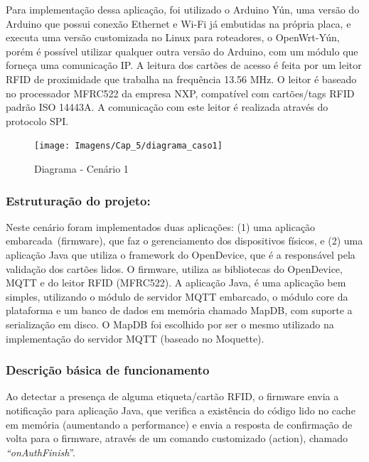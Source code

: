 Para implementação dessa aplicação, foi utilizado o Arduino Yún, uma
versão do Arduino que possui conexão Ethernet e Wi-Fi já embutidas
na própria placa, e executa uma versão customizada no Linux para roteadores,
o OpenWrt-Yún\cite{openwrt-yun}, porém é possível utilizar qualquer
outra versão do Arduino, com um módulo que forneça uma comunicação
IP. A leitura dos cartões de acesso é feita por um leitor RFID de
proximidade que trabalha na frequência 13.56 MHz. O leitor é baseado
no processador MFRC522\cite{MFRC522} da empresa NXP, compatível com
cartões/tags RFID padrão ISO 14443A. A comunicação com este leitor
é realizada através do protocolo SPI\cite{spi1,spi2}.

\begin{figure}[H]
\begin{centering}
\texttt{[image: Imagens/Cap\_5/diagrama\_caso1]}
\par\end{centering}
\caption{Diagrama - Cenário 1 \label{fig:cenario1}}
\end{figure}


\subsubsection*{Estruturação do projeto:}

Neste cenário foram implementados duas aplicações: (1) uma aplicação
embarcada~(firmware), que faz o gerenciamento dos dispositivos físicos,
e (2) uma aplicação Java que utiliza o framework do OpenDevice, que
é a responsável pela validação dos cartões lidos. O firmware, utiliza
as bibliotecas do OpenDevice, MQTT\cite{lib-mqtt} e do leitor RFID
(MFRC522)\cite{lib-MFRC522}. A aplicação Java, é uma aplicação bem
simples, utilizando o módulo de servidor MQTT embarcado, o módulo
core da plataforma e um banco de dados em memória chamado MapDB\cite{mapdb},
com suporte a serialização em disco. O MapDB foi escolhido por ser
o mesmo utilizado na implementação do servidor MQTT (baseado no Moquette).

\subsubsection*{Descrição básica de funcionamento}

Ao detectar a presença de alguma etiqueta/cartão RFID, o firmware
envia a notificação para aplicação Java, que verifica a existência
do código lido no cache em memória (aumentando a performance) e envia
a resposta de confirmação de volta para o firmware, através de um
comando customizado (action), chamado \emph{``onAuthFinish}''. 

